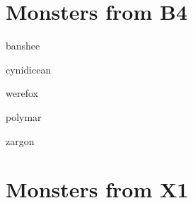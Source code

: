 \documentclass[letterpaper,serif]{module}
\begin{document}
\part{Monsters from B4}

\begin{newmonster}{banshee}\end{newmonster}
\begin{newmonster}{cynidicean}\end{newmonster}
\begin{newmonster}{werefox}\end{newmonster}
\begin{newmonster}{polymar}\end{newmonster}
\begin{newmonster}{zargon}\end{newmonster}

\part{Monsters from X1}
\end{document}
